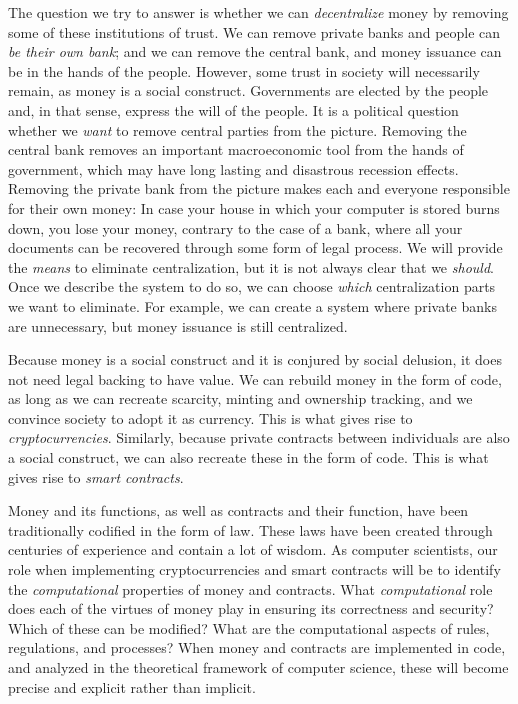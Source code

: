 The question we try to answer is whether we can \emph{decentralize} money
by removing some of these institutions of trust. We can remove private banks
and people can \emph{be their own bank}; and we can remove the central bank, and
money issuance can be in the hands of the people. However, some trust in society will
necessarily remain, as money is a social construct. Governments are elected by
the people and, in that sense, express the will of the people. It is a political
question whether we \emph{want} to remove central parties from the picture. Removing
the central bank removes an important macroeconomic tool from the hands of
government, which may have long lasting and disastrous recession effects.
Removing the private bank from the picture makes each and everyone responsible
for their own money: In case your house in which your computer is stored
burns down, you lose your money, contrary to the case of a bank, where all
your documents can be recovered through some form of legal process. We will
provide the \emph{means} to eliminate centralization, but it is not always clear that
we \emph{should}. Once we describe the system to do so, we can choose
\emph{which} centralization parts we want to eliminate. For example, we can
create a system where private banks are unnecessary, but money issuance
is still centralized.

Because money is a social construct and it is conjured by social delusion,
it does not need legal backing to have value. We can rebuild money in the form
of code, as long as we can recreate scarcity, minting and ownership tracking,
and we convince society to adopt it as currency. This is what gives rise to
\emph{cryptocurrencies}. Similarly, because private contracts between individuals
are also a social construct, we can also recreate these in the form of code.
This is what gives rise to \emph{smart contracts}.

Money and its functions, as well as contracts and their function, have been
traditionally codified in the form of law. These laws have been created through
centuries of experience and contain a lot of wisdom. As computer scientists, our role when implementing
cryptocurrencies and smart contracts will be to identify the \emph{computational} properties of
money and contracts. What \emph{computational} role does each of the virtues of money play
in ensuring its correctness and security? Which of these can be modified?
What are the computational aspects of rules, regulations, and processes?
When money and contracts are implemented in code, and analyzed in the theoretical
framework of computer science, these will become precise and explicit rather than
implicit.

